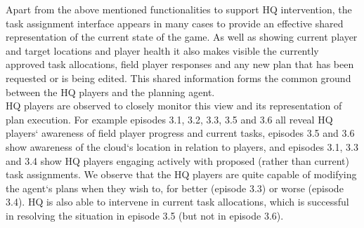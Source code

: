 Apart from the above mentioned functionalities to support HQ intervention, the task assignment interface appears in many cases to provide an effective shared representation of the current state of the game. As well as showing current player and target locations and player health it also makes visible the currently approved task allocations, field player responses and any new plan that has been requested or is being edited. This shared information forms the common ground between the HQ players and the planning agent.\\

HQ players are observed to closely monitor this view and its representation of plan execution. For example episodes 3.1, 3.2, 3.3, 3.5 and 3.6 all reveal HQ players` awareness of field player progress and current tasks, episodes 3.5 and 3.6 show awareness of the cloud`s location in relation to players, and episodes 3.1, 3.3 and 3.4 show HQ players engaging actively with proposed (rather than current) task assignments. We observe that the HQ players are quite capable of modifying the agent`s plans when they wish to, for better (episode 3.3) or worse (episode 3.4). HQ is also able to intervene in current task allocations, which is successful in resolving the situation in episode 3.5 (but not in episode 3.6).\\




